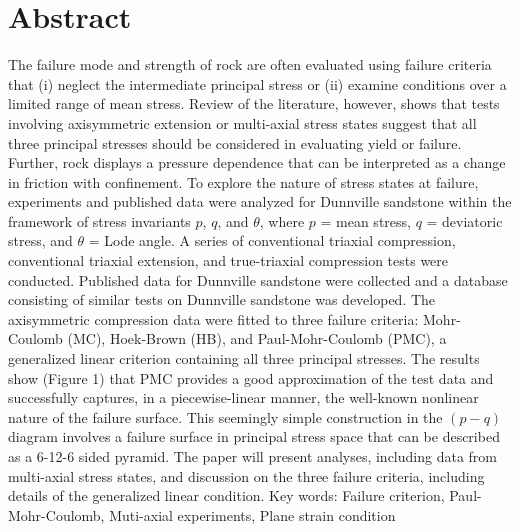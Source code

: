 

\cleardoublepage
\chapter*{Abstract}
The failure mode and strength of rock are often evaluated using failure criteria that (i) neglect the intermediate principal stress or (ii) examine conditions over a limited range of mean stress. Review of the literature, however, shows that tests involving axisymmetric extension or multi-axial stress states suggest that all three principal stresses should be considered in evaluating yield or failure. Further, rock displays a pressure dependence that can be interpreted as a change in friction with confinement. To explore the nature of stress states at failure, experiments and published data were analyzed for Dunnville sandstone within the framework of stress invariants $p$, $q$, and $\theta$, where $p$ = mean stress, $q$ = deviatoric stress, and $\theta$ = Lode angle. A series of conventional triaxial compression, conventional triaxial extension, and true-triaxial compression tests were conducted. Published data for Dunnville sandstone were collected and a database consisting of similar tests on Dunnville sandstone was developed. The axisymmetric compression data were fitted to three failure criteria: Mohr-Coulomb (MC), Hoek-Brown (HB), and Paul-Mohr-Coulomb (PMC), a generalized linear criterion containing all three principal stresses. The results show (Figure 1) that PMC provides a good approximation of the test data and successfully captures, in a piecewise-linear manner, the well-known nonlinear nature of the failure surface. This seemingly simple construction in the $(p-q)$ diagram involves a failure surface in principal stress space that can be described as a 6-12-6 sided pyramid. The paper will present analyses, including data from multi-axial stress states, and discussion on the three failure criteria, including details of the generalized linear condition. 
\vskip0.5cm
Key words: 
Failure criterion, Paul-Mohr-Coulomb, Muti-axial experiments, Plane strain condition









